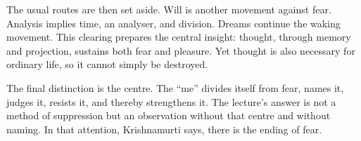 The usual routes are then set aside. Will is another movement against fear. Analysis implies time, an analyser, and division. Dreams continue the waking movement. This clearing prepares the central insight: thought, through memory and projection, sustains both fear and pleasure. Yet thought is also necessary for ordinary life, so it cannot simply be destroyed.

The final distinction is the centre. The ``me'' divides itself from fear, names it, judges it, resists it, and thereby strengthens it. The lecture's answer is not a method of suppression but an observation without that centre and without naming. In that attention, Krishnamurti says, there is the ending of fear.
